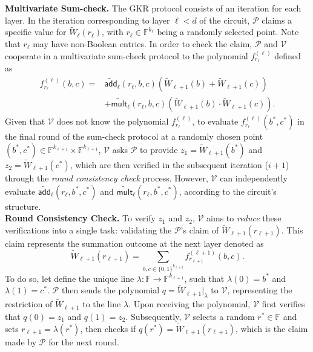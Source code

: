 \noindent\textbf{Multivariate Sum-check.}
The GKR protocol consists of an iteration for each layer. In the iteration corresponding to layer $\ell<d$ of the circuit,  $\mathcal{P}$ claims a specific value for $\widetilde{W}_\ell(r_\ell)$, with $r_\ell \in \mathbb{F}^{k_\ell}$ being a randomly selected point. Note that $r_\ell$ may have non-Boolean entries. In order to check the claim, $\mathcal{P}$ and $\mathcal{V}$ cooperate in a multivariate sum-check protocol \cite{Lund1992Sumcheck} to the polynomial $f_{r_\ell}^{(\ell)}$ defined as
\begin{align*}
	f_{r_\ell}^{(\ell)}(b,c) =  & \widetilde{\mathsf{add}}_\ell(r_\ell, b, c) \left( \widetilde{W}_{\ell+1}(b) + \widetilde{W}_{\ell+1}(c) \right) \\ & + \widetilde{\mathsf{mult}}_\ell(r_\ell, b, c) \left( \widetilde{W}_{\ell+1}(b) \cdot \widetilde{W}_{\ell+1}(c) \right).
\end{align*}
Given that $\mathcal{V}$ does not know the polynomial $f_{r_\ell}^{(\ell)}$, to evaluate $f_{r_\ell}^{(\ell)}(b^*, c^*)$ in the final round of the sum-check protocol at a randomly chosen point $(b^*, c^*) \in \mathbb{F}^{k_{\ell+1}} \times \mathbb{F}^{k_{\ell+1}}$,  $\mathcal{V}$ asks $\mathcal{P}$ to provide $z_1 = \widetilde{W}_{\ell+1}(b^*)$ and $z_2 = \widetilde{W}_{\ell+1}(c^*)$, which are then verified in the subsequent iteration ($i+1$) through the \textit{round consistency check} process. However,  $\mathcal{V}$ can independently evaluate $\widetilde{\mathsf{add}}_\ell(r_\ell, b^*, c^*)$ and $\widetilde{\mathsf{mult}}_\ell(r_\ell, b^*, c^*)$, according to the circuit's structure.\\


\noindent\textbf{Round Consistency Check.}
To verify $z_1$ and $z_2$, $\mathcal{V}$ aims to \textit{reduce} these verifications into a single task: validating the $\mathcal{P}$'s  claim of $\widetilde{W}_{\ell+1}(r_{\ell+1})$. This claim represents the summation outcome at the next layer denoted as
\begin{equation*}
	\widetilde{W}_{\ell+1}(r_{\ell+1}) = \sum_{b,c \in \{0, 1\}^{k_{\ell+2}}} f_{r_{\ell+1}}^{(\ell+1)}(b,c).
\end{equation*}
To do so, let define the unique line  $\lambda: \mathbb{F} \rightarrow \mathbb{F}^{k_{\ell+1}}$, such that $\lambda(0) = b^*$ and $\lambda(1) = c^*$. $\mathcal{P}$ then sends the polynomial $q=\widetilde{W}_{\ell+1} \big|_\lambda$ to $\mathcal{V}$, representing the restriction of $\widetilde{W}_{\ell+1}$ to the line $\lambda$. Upon receiving the polynomial, $\mathcal{V}$ first verifies that $q(0) = z_1$ and $q(1) = z_2$. Subsequently, $\mathcal{V}$ selects a random $r^* \in \mathbb{F}$ and sets $r_{\ell+1} = \lambda(r^*)$, then checks if $q(r^*) = \widetilde{W}_{\ell+1}(r_{\ell+1})$, which is the claim made by $\mathcal{P}$ for the next round.\\

